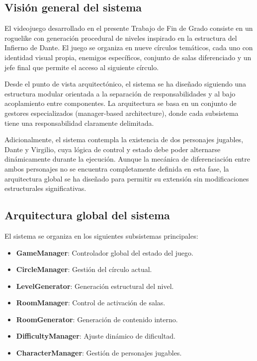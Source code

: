 \subsection{Visión general del sistema}

El videojuego desarrollado en el presente Trabajo de Fin de Grado consiste en un roguelike con generación procedural de niveles inspirado en la estructura del Infierno de Dante. El juego se organiza en nueve círculos temáticos, cada uno con identidad visual propia, enemigos específicos, conjunto de salas diferenciado y un jefe final que permite el acceso al siguiente círculo.

Desde el punto de vista arquitectónico, el sistema se ha diseñado siguiendo una estructura modular orientada a la separación de responsabilidades y al bajo acoplamiento entre componentes. La arquitectura se basa en un conjunto de gestores especializados (manager-based architecture), donde cada subsistema tiene una responsabilidad claramente delimitada.

Adicionalmente, el sistema contempla la existencia de dos personajes jugables, Dante y Virgilio, cuya lógica de control y estado debe poder alternarse dinámicamente durante la ejecución. Aunque la mecánica de diferenciación entre ambos personajes no se encuentra completamente definida en esta fase, la arquitectura global se ha diseñado para permitir su extensión sin modificaciones estructurales significativas.

\subsection{Arquitectura global del sistema}

El sistema se organiza en los siguientes subsistemas principales:

\begin{itemize}
    \item \textbf{GameManager}: Controlador global del estado del juego.
    \item \textbf{CircleManager}: Gestión del círculo actual.
    \item \textbf{LevelGenerator}: Generación estructural del nivel.
    \item \textbf{RoomManager}: Control de activación de salas.
    \item \textbf{RoomGenerator}: Generación de contenido interno.
    \item \textbf{DifficultyManager}: Ajuste dinámico de dificultad.
    \item \textbf{CharacterManager}: Gestión de personajes jugables.
\end{itemize}


